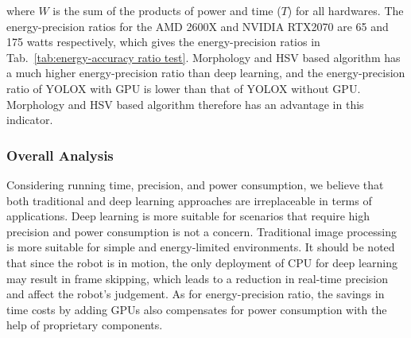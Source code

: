 where $W$ is the sum of the products of power and time ($T$) for all hardwares. The energy-precision ratios for the AMD 2600X and NVIDIA RTX2070 are 65 and 175 watts respectively, which gives the energy-precision ratios in Tab.~\ref{tab:energy-accuracy ratio test}. Morphology and HSV based algorithm has a much higher energy-precision ratio than deep learning, and the energy-precision ratio of YOLOX with GPU is lower than that of YOLOX without GPU. Morphology and HSV based algorithm therefore has an advantage in this indicator.

\begin{table}[htb]
\centering
\caption{The results of the energy-precision ratio test}
\label{tab:energy-accuracy ratio test}
\end{table}

\subsubsection{Overall Analysis}
Considering running time, precision, and power consumption, we believe that both traditional and deep learning approaches are irreplaceable in terms of applications. Deep learning is more suitable for scenarios that require high precision and power consumption is not a concern. Traditional image processing is more suitable for simple and energy-limited environments. It should be noted that since the robot is in motion, the only deployment of CPU for deep learning may result in frame skipping, which leads to a reduction in real-time precision and affect the robot's judgement. As for energy-precision ratio, the savings in time costs by adding GPUs also compensates for power consumption with the help of proprietary components. 
